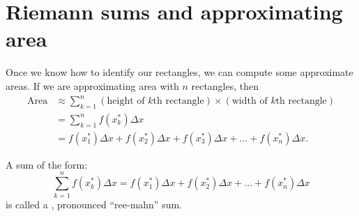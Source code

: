 \documentclass{ximera}
\begin{document}
\section{Riemann sums and approximating area}

Once we know how to identify our rectangles, we can compute some
approximate areas. If we are approximating area with $n$ rectangles, then 
\begin{align*}
  \text{Area} &\approx \sum_{k=1}^n (\text{height of $k$th rectangle})\times(\text{width of $k$th rectangle}) \\
  &=\sum_{k=1}^n  f(x_k^*)\Delta x \\
  &=  f(x_1^*)\Delta x +  f(x_2^*)\Delta x +   f(x_3^*)\Delta x + \dots +   f(x_n^*)\Delta x. 
\end{align*}


\begin{definition}
  A sum of the form:
  \[
  \sum_{k=1}^n  f(x_k^*)\Delta x  = f(x_1^*)\Delta x +  f(x_2^*)\Delta x + \dots +   f(x_n^*)\Delta x
  \]
  is called a , pronounced ``ree-mahn'' sum. 
\end{definition}
\end{document}
